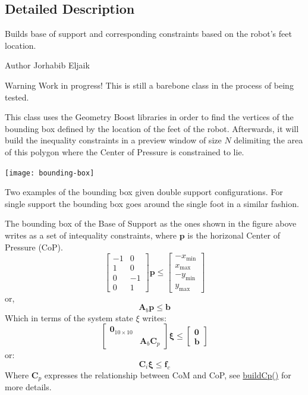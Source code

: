 \subsection{\-Detailed \-Description}
\-Builds base of support and corresponding constraints based on the robot's feet location. 

\begin{DoxyAuthor}{\-Author}
\-Jorhabib \-Eljaik \cite{ibanezThesis2015} 
\end{DoxyAuthor}
\begin{DoxyWarning}{\-Warning}
\-Work in progress! \-This is still a barebone class in the process of being tested.
\end{DoxyWarning}
\-This class uses the \-Geometry \-Boost libraries in order to find the vertices of the bounding box defined by the location of the feet of the robot. \-Afterwards, it will build the inequality constraints in a preview window of size $N$ delimiting the area of this polygon where the \-Center of \-Pressure is constrained to lie.


\begin{DoxyImage}
\texttt{[image: bounding-box]}
\caption{\-Two examples of the bounding box given double support configurations. \-For single support the bounding box goes around the single foot in a similar fashion.}
\end{DoxyImage}
 \-The bounding box of the \-Base of \-Support as the ones shown in the figure above writes as a set of intequality constraints, where $\mathbf{p}$ is the horizonal \-Center of \-Pressure (\-Co\-P). \[ \left[\begin{array}{cc} -1 & 0\\ 1 & 0\\ 0 & -1\\ 0 & 1 \end{array}\right] \mathbf{p} \leq \left[\begin{array}{c} -x_{\text{min}}\\ x_{\text{max}}\\ -y_{\text{min}}\\ y_{\text{max}} \end{array}\right] \] or, \[ \mathbf{A}_b\mathbf{p} \leq \mathbf{b} \] \-Which in terms of the system state $\xi$ writes\-: \[ \left[\begin{array}{cc} \mathbf{0}_{10\times10} & \\ & \mathbf{A}_b \mathbf{C}_p \end{array}\right] \mathbf{\xi} \leq \left[\begin{array}{c} \mathbf{0} \\ \mathbf{b} \end{array}\right] \] or\-: \[ \mathbf{C}_i \mathbf{\xi} \leq \mathbf{f}_c \] \-Where $\mathbf{C}_p$ expresses the relationship between \-Co\-M and \-Co\-P, see \hyperlink{classBaseOfSupport_a7efc6cad789632e88d8c85ab171a9eef}{build\-Cp()} for more details.

